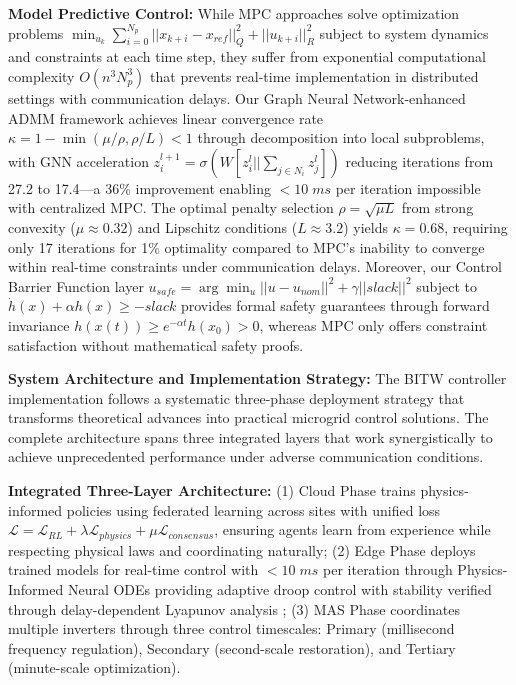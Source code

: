 \documentclass[12pt]{article}
\begin{document}
\textbf{Model Predictive Control:} While MPC approaches solve optimization problems $\min_{u_k} \sum_{i=0}^{N_p} ||x_{k+i} - x_{ref}||^2_Q + ||u_{k+i}||^2_R$ subject to system dynamics and constraints at each time step, they suffer from exponential computational complexity $O(n^3 N_p^3)$ that prevents real-time implementation in distributed settings with communication delays. Our Graph Neural Network-enhanced ADMM framework achieves linear convergence rate $\kappa = 1 - \min(\mu/\rho, \rho/L) < 1$ through decomposition into local subproblems, with GNN acceleration $z^{l+1}_i = \sigma(W[z^l_i || \sum_{j \in N_i} z^l_j])$ reducing iterations from 27.2 to 17.4---a 36\% improvement enabling $<10\;ms$ per iteration impossible with centralized MPC. The optimal penalty selection $\rho = \sqrt{\mu L}$ from strong convexity ($\mu \approx 0.32$) and Lipschitz conditions ($L \approx 3.2$) yields $\kappa = 0.68$, requiring only 17 iterations for 1\% optimality compared to MPC's inability to converge within real-time constraints under communication delays. Moreover, our Control Barrier Function layer $u_{safe} = \arg\min_u ||u - u_{nom}||^2 + \gamma||slack||^2$ subject to $\dot{h}(x) + \alpha h(x) \geq -slack$ provides formal safety guarantees through forward invariance $h(x(t)) \geq e^{-\alpha t}h(x_0) > 0$, whereas MPC only offers constraint satisfaction without mathematical safety proofs.

\textbf{System Architecture and Implementation Strategy:} The BITW controller implementation follows a systematic three-phase deployment strategy that transforms theoretical advances into practical microgrid control solutions. The complete architecture spans three integrated layers that work synergistically to achieve unprecedented performance under adverse communication conditions.

\textbf{Integrated Three-Layer Architecture:} (1) Cloud Phase trains physics-informed policies using federated learning across sites with unified loss $\mathcal{L} = \mathcal{L}_{RL} + \lambda \mathcal{L}_{physics} + \mu \mathcal{L}_{consensus}$, ensuring agents learn from experience while respecting physical laws and coordinating naturally; (2) Edge Phase deploys trained models for real-time control with $<10\;ms$ per iteration through Physics-Informed Neural ODEs providing adaptive droop control with stability verified through delay-dependent Lyapunov analysis \cite{fridman2014}; (3) MAS Phase coordinates multiple inverters through three control timescales: Primary (millisecond frequency regulation), Secondary (second-scale restoration), and Tertiary (minute-scale optimization).
\end{document}
